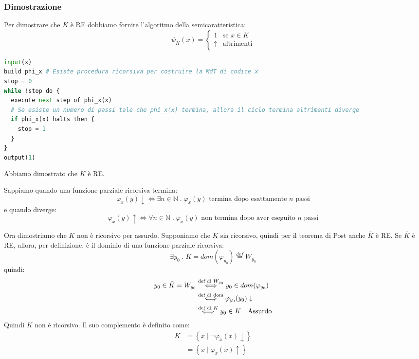 \documentclass[a4paper]{article}
\begin{document}
\subsubsection{Dimostrazione}
Per dimostrare che \( K \) è RE dobbiamo fornire l'algoritmo della semicaratteristica:
\[
  \psi_K(x) =
  \begin{cases}
    1 & \text{se } x \in K \\
    \uparrow & \text{altrimenti}
  \end{cases}
\] 
\begin{lstlisting}[language=Python]
input(x)
build phi_x # Esiste procedura ricorsiva per costruire la MdT di codice x
stop = 0
while !stop do {
  execute next step of phi_x(x)
  # Se esiste un numero di passi tale che phi_x(x) termina, allora il ciclo termina altrimenti diverge
  if phi_x(x) halts then {
    stop = 1
  }
}
output(1)
\end{lstlisting}
Abbiamo dimostrato che \( K \) è RE.
\begin{define}
  Sappiamo quando una funzione parziale ricorsiva termina: 
  \[
    \varphi_x(y) \downarrow \iff \exists n \in \mathbb{N} \;.\; \varphi_x(y)
    \text{ termina dopo esattamente } n \text{ passi}
  \] 
  e quando diverge:
  \[
    \varphi_x(y) \uparrow \iff \forall n \in \mathbb{N} \;.\; \varphi_x(y)
    \text{ non termina dopo aver eseguito } n \text{ passi}
  \] 
\end{define}
Ora dimostriamo che \( K \) non è ricorsivo per assurdo. Supponiamo che \( K \) sia
ricorsivo, quindi per il teorema di Post anche \( \bar{K} \) è RE. Se \( \bar{K} \) è RE,
allora, per definizione, è il dominio di una funzione parziale ricorsiva:
\[
  \exists y_0 \;.\; \bar{K} = dom(\varphi_{y_0}) \stackrel{def}{=} W_{y_0}
\] 
quindi:
\[
  \begin{aligned}
    y_0 \in \bar{K} = W_{y_0} &\stackrel{\text{def di \( W_{y_0} \)}}{\iff}
    y_0 \in dom(\varphi_{y_0}) \\
                              &\stackrel{\text{def di dom}}{\iff} \varphi_{y_0}(y_0) \downarrow \\
                              &\stackrel{\text{def di \( K \)}}{\iff} y_0 \in K \quad \text{Assurdo}
  \end{aligned}
\]
Quindi \( K \) non è ricorsivo. Il suo complemento è definito come:
\[
  \begin{aligned}
    \bar{K} &= \left\{ \left. x \;\right|\; \neg \varphi_x(x) \downarrow \right\}\\
            &= \left\{ \left. x \;\right|\; \varphi_x(x) \uparrow \right\}
  \end{aligned}
\] 
\end{document}
